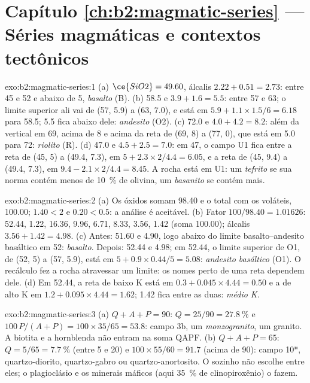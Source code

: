 \section*{Capítulo \ref{ch:b2:magmatic-series} --- Séries magmáticas e contextos tectônicos}

\begin{solution}{exo:b2:magmatic-series:1}
(a) $\ce{SiO2} = 49.60$, álcalis $2.22 + 0.51 = 2.73$: entre 45 e 52 e abaixo de 5,
\emph{basalto} (B). (b) 58.5 e $3.9 + 1.6 = 5.5$: entre 57 e 63; o limite
superior ali vai de (57, 5.9) a (63, 7.0), e está em $5.9 + 1.1\times1.5/6 = 6.18$
para 58.5; 5.5 fica abaixo dele: \emph{andesito} (O2). (c) 72.0 e $4.0 + 4.2 = 8.2$:
além da vertical em 69, acima de 8 e acima da reta de (69, 8) a (77, 0), que está
em 5.0 para 72: \emph{riolito} (R). (d) 47.0 e $4.5 + 2.5 = 7.0$: em 47, o campo U1
fica entre a reta de (45, 5) a (49.4, 7.3), em $5 + 2.3\times2/4.4 = 6.05$, e
a reta de (45, 9.4) a (49.4, 7.3), em $9.4 - 2.1\times2/4.4 = 8.45$. A rocha está
em U1: um \emph{tefrito} se sua norma contém menos de \qty{10}{\percent} de olivina, um
\emph{basanito} se contém mais.
\end{solution}

\begin{solution}{exo:b2:magmatic-series:2}
(a) Os óxidos somam 98.40 e o total com os voláteis, 100.00;
 $1.40 < 2$ e  $0.20 < 0.5$: a análise é aceitável. (b) Fator
$100/98.40 = 1.01626$:  52.44,  1.22,  16.36,
 9.96,  6.71,  8.33,  3.56,  1.42
(soma 100.00); álcalis $3.56 + 1.42 = 4.98$. (c) Antes: 51.60 e 4.90, logo abaixo do
limite basalto--andesito basáltico em 52: \emph{basalto}. Depois: 52.44 e 4.98; em
52.44, o limite superior de O1, de (52, 5) a (57, 5.9), está em $5 + 0.9\times0.44/5
= 5.08$: \emph{andesito basáltico} (O1). O recálculo fez a rocha atravessar um
limite: os nomes perto de uma reta dependem dele. (d) Em 52.44, a reta de baixo K está em $0.3 +
0.045\times4.44 = 0.50$ e a de alto K em $1.2 + 0.095\times4.44 = 1.62$; 1.42
fica entre as duas: \emph{médio K}.
\end{solution}

\begin{solution}{exo:b2:magmatic-series:3}
(a) $Q + A + P = 90$: $Q = 25/90 = \qty{27.8}{\percent}$ e $100\,P/(A + P) =
100\times35/65 = 53.8$: campo 3b, um \emph{monzogranito}, um granito. A biotita e a
hornblenda não entram na soma QAPF. (b) $Q + A + P = 65$: $Q = 5/65 =
\qty{7.7}{\percent}$ (entre 5 e 20) e $100\times55/60 = 91.7$ (acima de 90): campo
10*, quartzo-diorito, quartzo-gabro ou quartzo-anortosito. O  sozinho não
escolhe entre eles; o plagioclásio e os minerais máficos (aqui
\qty{35}{\percent} de clinopiroxênio) o fazem.
\end{solution}

